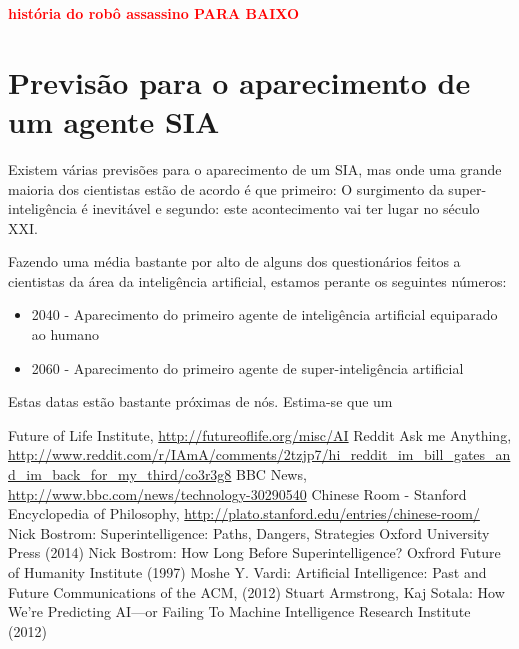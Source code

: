 \documentclass[runningheads,a4paper]{llncs}
\begin{document}
\textcolor{red}{\textbf{história do robô assassino PARA BAIXO}}

\section{Previsão para o aparecimento de um agente SIA}

Existem várias previsões para o aparecimento de um SIA, mas onde uma grande maioria dos cientistas estão de acordo é que primeiro: O surgimento da super-inteligência é inevitável e segundo: este acontecimento vai ter lugar no século XXI\@.

Fazendo uma média bastante por alto de alguns dos questionários feitos a cientistas da área da inteligência artificial, estamos perante os seguintes números:

\begin{itemize}

  \item 2040 - Aparecimento do primeiro agente de inteligência artificial equiparado ao humano
  \item 2060 - Aparecimento do primeiro agente de super-inteligência artificial

\end{itemize}

Estas datas estão bastante próximas de nós. Estima-se que um

\begin{thebibliography}{4}

   Future of Life Institute, \url{http://futureoflife.org/misc/AI}
   Reddit Ask me Anything, \url{http://www.reddit.com/r/IAmA/comments/2tzjp7/hi_reddit_im_bill_gates_and_im_back_for_my_third/co3r3g8}
   BBC News, \url{http://www.bbc.com/news/technology-30290540}
   Chinese Room - Stanford Encyclopedia of Philosophy, \url{http://plato.stanford.edu/entries/chinese-room/}
   Nick Bostrom:
    Superintelligence: Paths, Dangers, Strategies
    Oxford University Press (2014)
   Nick Bostrom:
    How Long Before Superintelligence?
    Oxfrord Future of Humanity Institute (1997)
   Moshe Y. Vardi:
    Artificial Intelligence: Past and Future
    Communications of the ACM, (2012)
   Stuart Armstrong, Kaj Sotala:
    How We’re Predicting AI—or Failing To
    Machine Intelligence Research Institute (2012)

\end{thebibliography}
\end{document}
